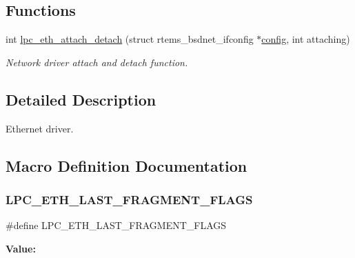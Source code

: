 \subsection*{Functions}
\begin{DoxyCompactItemize}
\item 
int \mbox{\hyperlink{group__RTEMSBSPsARMLPC24XX_ga1ee87990424a1bed28cb5081a56043b2}{lpc\+\_\+eth\+\_\+attach\+\_\+detach}} (struct rtems\+\_\+bsdnet\+\_\+ifconfig $\ast$\mbox{\hyperlink{structconfig__s}{config}}, int attaching)
\begin{DoxyCompactList}\small\item\em Network driver attach and detach function. \end{DoxyCompactList}\end{DoxyCompactItemize}


\subsection{Detailed Description}
Ethernet driver. 



\subsection{Macro Definition Documentation}
\mbox{\label{lpc-ethernet_8c_a1fcf5c9d950ed1641274279b68e79efa}} 
\subsubsection{\texorpdfstring{LPC\_ETH\_LAST\_FRAGMENT\_FLAGS}{LPC\_ETH\_LAST\_FRAGMENT\_FLAGS}}
{\footnotesize\ttfamily \#define L\+P\+C\+\_\+\+E\+T\+H\+\_\+\+L\+A\+S\+T\+\_\+\+F\+R\+A\+G\+M\+E\+N\+T\+\_\+\+F\+L\+A\+GS}

{\bfseries Value\+:}
\begin{DoxyCode}{0}

\end{DoxyCode}
\mbox{\label{lpc-ethernet_8c_ac5f72856dd85b6d14247265b65d2990a}} 
